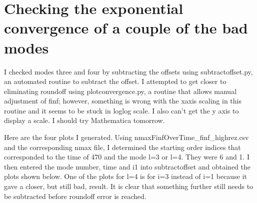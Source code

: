 \documentclass{article}
\begin{document}
\section{Checking the exponential convergence of a couple of the bad modes}

I checked modes three and four by subtracting the offsets using subtractoffset.py, an automated routine to subtract the offset. I attempted to get closer to eliminating roundoff using plotconvergence.py, a routine that allows manual adjustment of finf; however, something is wrong with the xaxis scaling in this routine and it seems to be stuck in loglog scale. I also can't get the y axis to display a scale. I should try Mathematica tomorrow.

Here are the four plots I generated. Using nmaxFinfOverTime\_finf\_highrez.csv and the corresponding nmax file, I determined the starting order indices that corresponded to the time of 470 and the mode l=3 or l=4. They were 6 and 1. I then entered the mode number, time and i1 into subtractoffset and obtained the plots shown below. One of the plots for l=4 is for i=3 instead of i=1 because it gave a closer, but still bad, result. It is clear that something further still needs to be subtracted before roundoff error is reached.
\end{document}
